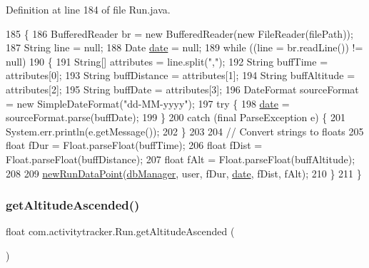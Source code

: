 Definition at line 184 of file Run.\+java.


\begin{DoxyCode}
185                                                       \{
186         BufferedReader br = \textcolor{keyword}{new} BufferedReader(\textcolor{keyword}{new} FileReader(filePath));
187         String line = null;
188         Date \mbox{\hyperlink{classcom_1_1activitytracker_1_1_run_a66934b1f4fe6bc74a4e98574a2892764}{date}} = null;
189         \textcolor{keywordflow}{while} ((line = br.readLine()) != null)  
190         \{
191             String[] attributes = line.split(\textcolor{stringliteral}{","});
192             String buffTime = attributes[0];
193             String buffDistance = attributes[1];
194             String buffAltitude = attributes[2];
195             String buffDate = attributes[3];
196             DateFormat sourceFormat = \textcolor{keyword}{new} SimpleDateFormat(\textcolor{stringliteral}{"dd-MM-yyyy"});
197             \textcolor{keywordflow}{try} \{
198                 \mbox{\hyperlink{classcom_1_1activitytracker_1_1_run_a66934b1f4fe6bc74a4e98574a2892764}{date}} = sourceFormat.parse(buffDate);
199             \}
200             \textcolor{keywordflow}{catch} (\textcolor{keyword}{final} ParseException e) \{
201                 System.err.println(e.getMessage());
202             \}
203 
204             \textcolor{comment}{// Convert strings to floats}
205             \textcolor{keywordtype}{float} fDur = Float.parseFloat(buffTime);
206             \textcolor{keywordtype}{float} fDist = Float.parseFloat(buffDistance);
207             \textcolor{keywordtype}{float} fAlt = Float.parseFloat(buffAltitude);
208 
209             \mbox{\hyperlink{classcom_1_1activitytracker_1_1_run_a5dea6f1860431103d553ce770382afe0}{newRunDataPoint}}(\mbox{\hyperlink{classcom_1_1activitytracker_1_1_run_ab90e32eda9f4c671ae3575f971edca6b}{dbManager}}, user, fDur, \mbox{\hyperlink{classcom_1_1activitytracker_1_1_run_a66934b1f4fe6bc74a4e98574a2892764}{date}}, fDist, fAlt);
210         \} 
211     \}
\end{DoxyCode}
\mbox{\label{classcom_1_1activitytracker_1_1_run_a9365647310eee181b15a85eaf6b95e93}} 
\subsubsection{\texorpdfstring{get\+Altitude\+Ascended()}{getAltitudeAscended()}}
{\footnotesize\ttfamily float com.\+activitytracker.\+Run.\+get\+Altitude\+Ascended (\begin{DoxyParamCaption}{ }\end{DoxyParamCaption})}

